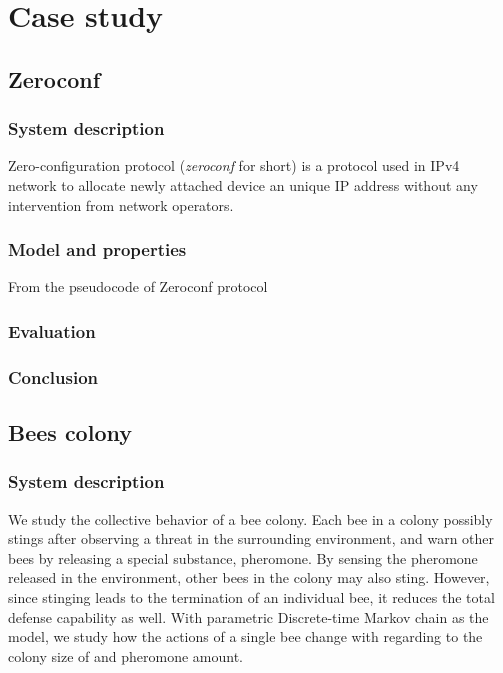 \chapter{Case study}
\section{Zeroconf}
\subsection{System description}
Zero-configuration protocol (\textit{zeroconf} for short) is a protocol used in IPv4 network to
allocate newly attached device an unique IP address without any intervention from network operators.

\subsection{Model and properties}
From the pseudocode of Zeroconf protocol 
\subsection{Evaluation}
\subsection{Conclusion}

\section{Bees colony}
\subsection{System description}
We study the collective behavior of a bee colony. Each bee in a colony possibly stings after
observing a threat in the surrounding environment, and warn other bees by releasing a special
substance, pheromone. By sensing the pheromone released in the environment, other bees in the colony
may also sting. However, since stinging leads to the termination of an individual bee, it reduces
the total defense capability as well. With parametric Discrete-time Markov chain as the model, we
study how the actions of a single bee change with regarding to the colony size of and pheromone
amount.

